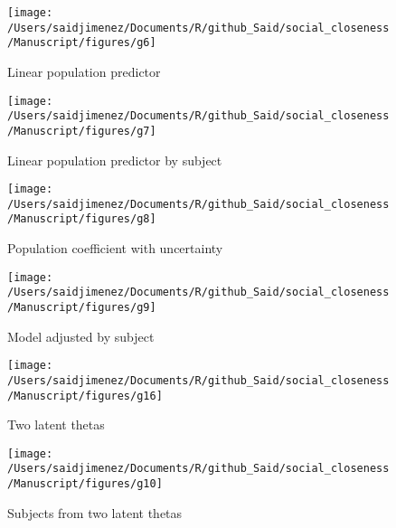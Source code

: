 \documentclass[12pt,]{article}
\begin{document}
\begin{figure}

{\centering \texttt{[image: /Users/saidjimenez/Documents/R/github\_Said/social\_closeness/Manuscript/figures/g6]} 

}

\caption{Linear population predictor}\label{fig:g6}
\end{figure}

\begin{figure}

{\centering \texttt{[image: /Users/saidjimenez/Documents/R/github\_Said/social\_closeness/Manuscript/figures/g7]} 

}

\caption{Linear population predictor by subject}\label{fig:g7}
\end{figure}

\begin{figure}

{\centering \texttt{[image: /Users/saidjimenez/Documents/R/github\_Said/social\_closeness/Manuscript/figures/g8]} 

}

\caption{Population coefficient with uncertainty}\label{fig:g8}
\end{figure}

\begin{figure}

{\centering \texttt{[image: /Users/saidjimenez/Documents/R/github\_Said/social\_closeness/Manuscript/figures/g9]} 

}

\caption{Model adjusted by subject}\label{fig:g9}
\end{figure}

\begin{figure}

{\centering \texttt{[image: /Users/saidjimenez/Documents/R/github\_Said/social\_closeness/Manuscript/figures/g16]} 

}

\caption{Two latent thetas}\label{fig:g16}
\end{figure}

\begin{figure}

{\centering \texttt{[image: /Users/saidjimenez/Documents/R/github\_Said/social\_closeness/Manuscript/figures/g10]} 

}

\caption{Subjects from two latent thetas}\label{fig:g10}
\end{figure}
\end{document}
